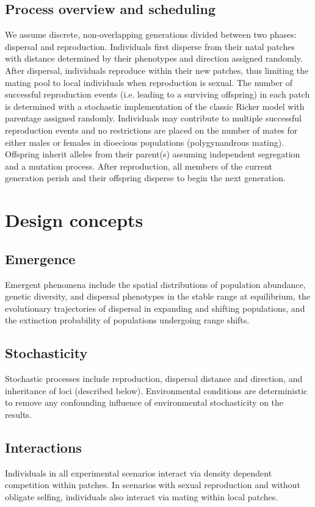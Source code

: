 \documentclass[11pt]{article}
\begin{document}
\subsection*{Process overview and scheduling} 
We assume discrete, non-overlapping generations divided between two phases: dispersal and reproduction. Individuals first disperse from their natal patches with distance determined by their phenotypes and direction assigned randomly. After dispersal, individuals reproduce within their new patches, thus limiting the mating pool to local individuals when reproduction is sexual. The number of successful reproduction events (i.e. leading to a surviving offspring) in each patch is determined with a stochastic implementation of the classic Ricker model with parentage assigned randomly. Individuals may contribute to multiple successful reproduction events and no restrictions are placed on the number of mates for either males or females in dioecious populations (polygynandrous mating). Offspring inherit alleles from their parent(s) assuming independent segregation and a mutation process. After reproduction, all members of the current generation perish and their offspring disperse to begin the next generation.

\section*{Design concepts}
\subsection*{Emergence} 
Emergent phenomena include the spatial distributions of population abundance, genetic diversity, and dispersal phenotypes in the stable range at equilibrium, the evolutionary trajectories of dispersal in expanding and shifting populations, and the extinction probability of populations undergoing range shifts.

\subsection*{Stochasticity} 
Stochastic processes include reproduction, dispersal distance and direction, and inheritance of loci (described below). Environmental conditions are deterministic to remove any confounding influence of environmental stochasticity on the results.

\subsection*{Interactions} 
Individuals in all experimental scenarios interact via density dependent competition within patches. In scenarios with sexual reproduction and without obligate selfing, individuals also interact via mating within local patches. 
\end{document}
